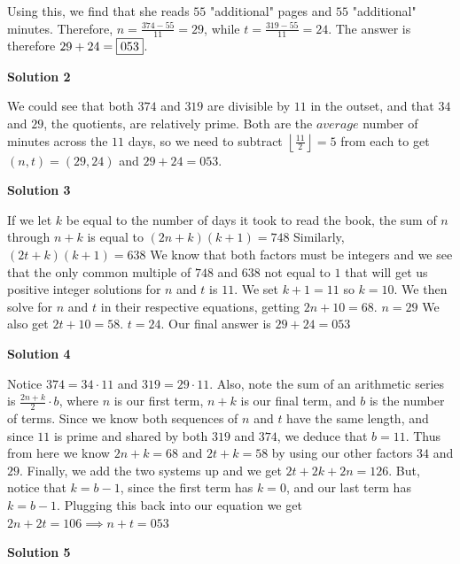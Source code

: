 \begin{enumerate}
 Using this, we find that she reads $55$ "additional" pages and $55$ "additional" minutes.  Therefore, $n=\frac{374-55}{11}=29$, while $t=\frac{319-55}{11}=24$.  The answer is therefore $29+24=\fbox{053}$.

 



\textbf{Solution 2}

We could see that both $374$ and $319$ are divisible by $11$ in the outset, and that $34$ and $29$, the quotients, are relatively prime. Both are the $average$ number of minutes across the $11$ days, so we need to subtract $\left \lfloor{\frac{11}{2}}\right \rfloor=5$ from each to get $(n,t)=(29,24)$ and $29+24=\boxed{053}$.

 



\textbf{Solution 3}

If we let $k$ be equal to the number of days it took to read the book, the sum of $n$ through $n+k$ is equal to $(2n+k)(k+1)=748$ Similarly, $(2t+k)(k+1)=638$ We know that both factors must be integers and we see that the only common multiple of $748$ and $638$ not equal to $1$ that will get us positive integer solutions for $n$ and $t$ is $11$. We set $k+1=11$ so $k=10$. We then solve for $n$ and $t$ in their respective equations, getting $2n+10=68$.  $n=29$  We also get $2t+10=58$.  $t=24$. Our final answer is $29+24=\boxed{053}$




\textbf{Solution 4}

Notice $374=34\cdot 11$ and $319=29\cdot 11$. Also, note the sum of an arithmetic series is $\frac{2n+k}{2} \cdot b$, where $n$ is our first term, $n+k$ is our final term, and $b$ is the number of terms. Since we know both sequences of $n$ and $t$ have the same length, and since $11$ is prime and shared by both $319$ and $374$, we deduce that $b=11$. Thus from here we know $2n+k=68$ and $2t+k=58$ by using our other factors $34$ and $29$. Finally, we add the two systems up and we get $2t+2k+2n=126$. But, notice that $k=b-1$, since the first term has $k=0$, and our last term has $k=b-1$. Plugging this back into our equation we get $2n+2t=106 \implies n+t=\boxed{053}$




\textbf{Solution 5}


\end{enumerate}
